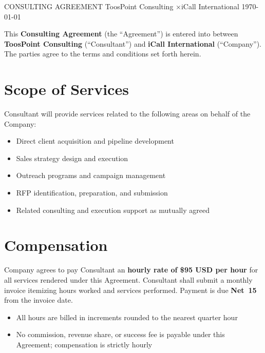 \documentclass{toospoint}
\begin{document}
\contracttitle
  {CONSULTING AGREEMENT}
  {ToosPoint Consulting \quad×\quad iCall International}
  {\today}

\begin{clausebox}
\sffamily\small
This \textbf{Consulting Agreement} (the ``Agreement'') is entered into between
\textbf{ToosPoint Consulting} (``Consultant'') and \textbf{iCall International}
(``Company''). The parties agree to the terms and conditions set forth herein.
\end{clausebox}

\vspace{10pt}

\section{Scope of Services}

Consultant will provide services related to the following areas on behalf of the Company:

\begin{itemize}[leftmargin=1.5em, itemsep=4pt, topsep=4pt]
  \item Direct client acquisition and pipeline development
  \item Sales strategy design and execution
  \item Outreach programs and campaign management
  \item RFP identification, preparation, and submission
  \item Related consulting and execution support as mutually agreed
\end{itemize}

\section{Compensation}

Company agrees to pay Consultant an \textbf{hourly rate of \$95 USD per hour} for
all services rendered under this Agreement. Consultant shall submit a monthly
invoice itemizing hours worked and services performed. Payment is due
\textbf{Net~15} from the invoice date.

\begin{itemize}[leftmargin=1.5em, itemsep=4pt, topsep=4pt]
  \item All hours are billed in increments rounded to the nearest quarter hour
  \item No commission, revenue share, or success fee is payable under this
        Agreement; compensation is strictly hourly
\end{itemize}
\end{document}
